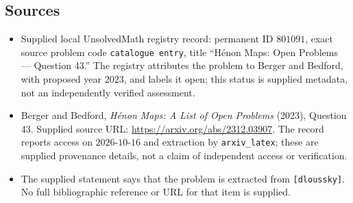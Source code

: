 \documentclass[11pt]{article}
\begin{document}
\subsection{Sources}
\begin{itemize}
\item Supplied local UnsolvedMath registry record: permanent ID \(801091\), exact source problem code \texttt{catalogue entry}, title ``H\'enon Maps: Open Problems --- Question 43.'' The registry attributes the problem to Berger and Bedford, with proposed year \(2023\), and labels it open; this status is supplied metadata, not an independently verified assessment.
\item Berger and Bedford, \emph{H\'enon Maps: A List of Open Problems} (2023), Question 43. Supplied source URL: \url{https://arxiv.org/abs/2312.03907}. The record reports access on \(2026\text{-}10\text{-}16\) and extraction by \texttt{arxiv\_latex}; these are supplied provenance details, not a claim of independent access or verification.
\item The supplied statement says that the problem is extracted from \texttt{[dloussky]}. No full bibliographic reference or URL for that item is supplied.
\end{itemize}
\end{document}
